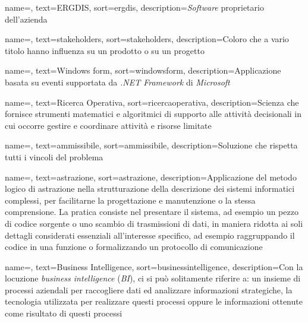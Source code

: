 {
    name=,
    text=ERGDIS,
    sort=ergdis,
    description={\textit{Software} proprietario dell'azienda \textit{\myCompany}}
}

{
    name=,
    text=stakeholders,
    sort=stakeholders,
    description={Coloro che a vario titolo hanno influenza su un
    prodotto o su un progetto}
}

{
    name=,
    text=Windows form,
    sort=windowsform,
    description={Applicazione basata su eventi
    supportata da \textit{.NET Framework} di \textit{Microsoft} \cite{site:wiki}}
}

{
    name=,
    text=Ricerca Operativa,
    sort=ricercaoperativa,
    description={Scienza che fornisce strumenti matematici e algoritmici di
    supporto alle attività decisionali in cui occorre gestire
    e coordinare attività e risorse limitate \cite{site:wiki}}
}

{
    name=,
    text=ammissibile,
    sort=ammissibile,
    description={Soluzione che rispetta tutti i vincoli del problema}
}

{
    name=,
    text=astrazione,
    sort=astrazione,
    description={Applicazione del metodo logico di astrazione nella strutturazione della
    descrizione dei sistemi informatici complessi, per facilitarne la progettazione e
    manutenzione o la stessa comprensione. La pratica consiste nel presentare il
    sistema, ad esempio un pezzo di codice sorgente o uno scambio di trasmissioni di
    dati, in maniera ridotta ai soli dettagli considerati essenziali all’interesse specifico,
    ad esempio raggruppando il codice in una funzione o formalizzando un protocollo
    di comunicazione \cite{site:wiki}}
}

{
    name=,
    text=Business Intelligence,
    sort=businessintelligence,
    description={Con la locuzione \textit{business intelligence}
    (\textit{BI}), ci si può solitamente riferire a: un insieme di processi aziendali per raccogliere dati ed analizzare
    informazioni strategiche, la tecnologia utilizzata per realizzare questi processi
    oppure le informazioni ottenute come risultato di questi processi \cite{site:wiki}}
}

